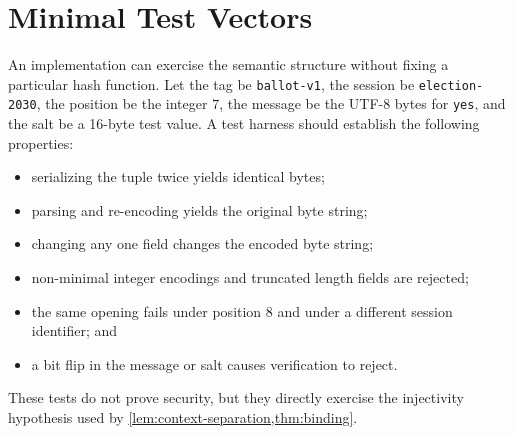 \section{Minimal Test Vectors}
\label{app:test-vectors}

An implementation can exercise the semantic structure without fixing a
particular hash function.  Let the tag be \texttt{ballot-v1}, the session be
\texttt{election-2030}, the position be the integer $7$, the message be the
UTF-8 bytes for \texttt{yes}, and the salt be a 16-byte test value.  A test
harness should establish the following properties:

\begin{itemize}
  \item serializing the tuple twice yields identical bytes;
  \item parsing and re-encoding yields the original byte string;
  \item changing any one field changes the encoded byte string;
  \item non-minimal integer encodings and truncated length fields are rejected;
  \item the same opening fails under position $8$ and under a different
        session identifier; and
  \item a bit flip in the message or salt causes verification to reject.
\end{itemize}

These tests do not prove security, but they directly exercise the injectivity
hypothesis used by \cref{lem:context-separation,thm:binding}.
